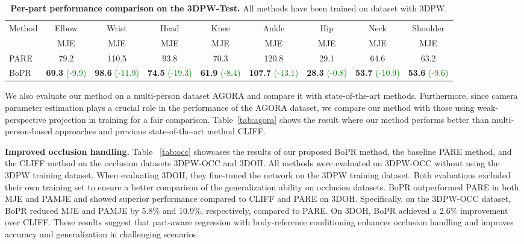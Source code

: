 \documentclass[10pt,twocolumn,letterpaper]{article}
\begin{document}
\begin{table*}
\centering
\begin{tabular}{lcccccccc}
\toprule[1.5pt]
\multirow{2}{*}{Method} & \multicolumn{1}{c}{Elbow} & \multicolumn{1}{c}{Wrist} & \multicolumn{1}{c}{Head}  & \multicolumn{1}{c}{Knee} & \multicolumn{1}{c}{Ankle} & \multicolumn{1}{c}{Hip} & \multicolumn{1}{c}{Neck} & \multicolumn{1}{c}{Shoulder}\\ 
 & MJE & MJE & MJE & MJE  & MJE  & MJE  & MJE  & MJE\\ \hline
PARE &79.2 &110.5 &93.8 &70.3 &120.8 &29.1 &64.6 &63.2 
\\ \hline
BoPR &\textbf{69.3} \textcolor{green}{(-9.9)} &\textbf{98.6} \textcolor{green}{(-11.9)} &\textbf{74.5} \textcolor{green}{(-19.3)} &\textbf{61.9} \textcolor{green}{(-8.4)} &\textbf{107.7} \textcolor{green}{(-13.1)} &\textbf{28.3} \textcolor{green}{(-0.8)} &\textbf{53.7} \textcolor{green}{(-10.9)}&\textbf{53.6} \textcolor{green}{(-9.6)}\\\bottomrule[1.5pt]
\end{tabular}
\caption{\textbf{Per-part performance comparison on the 3DPW-Test.} All methods have been trained on dataset with 3DPW.}
\label{tab:perpart}
\end{table*}



We also evaluate our method on a multi-person dataset AGORA and compare it with state-of-the-art methods. Furthermore, since camera parameter estimation plays a crucial role in the performance of the AGORA dataset,  we compare our method with those using weak-perspective projection in training for a fair comparison. Table~\ref{tab:agora} shows the result where our method performs better than multi-person-based approaches and previous state-of-the-art method CLIFF.













\noindent\textbf{Improved occlusion handling.}
Table ~\ref{tab:occ} showcases the results of our proposed BoPR method, the baseline PARE method, and the CLIFF method on the occlusion datasets 3DPW-OCC and 3DOH. All methods were evaluated on 3DPW-OCC without using the 3DPW training dataset. When evaluating 3DOH, they fine-tuned the network on the 3DPW training dataset. Both evaluations excluded their own training set to ensure a better comparison of the generalization ability on occlusion datasets. BoPR outperformed PARE in both MJE and PAMJE and showed superior performance compared to CLIFF and PARE on 3DOH. Specifically, on the 3DPW-OCC dataset, BoPR reduced MJE and PAMJE by 5.8\% and 10.9\%, respectively, compared to PARE. On 3DOH, BoPR achieved a 2.6\% improvement over CLIFF. These results suggest that part-aware regression with body-reference conditioning enhances occlusion handling and improves accuracy and generalization in challenging scenarios.
\end{document}
